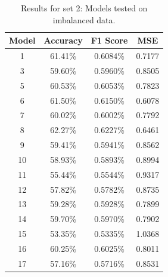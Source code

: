 \begin{table}[H]
	\begin{tabular}{|c|c|c|c|}
		\hline
		\textbf{Model} & \textbf{Accuracy} & \textbf{F1 Score} & \textbf{MSE} \\ \hline
		1              & 61.41\%             &  0.6084\%        &  0.7177   \\
		3              & 59.60\%             &  0.5960\%        &  0.8505   \\
		5              & 60.53\%             &  0.6053\%        &  0.7823   \\
		6              & 61.50\%             &  0.6150\%        &  0.6078   \\
		7              & 60.02\%             &  0.6002\%        &  0.7792   \\
		8              & 62.27\%             &  0.6227\%        &  0.6461   \\
		9              & 59.41\%             &  0.5941\%        &  0.8562   \\
		10             & 58.93\%             &  0.5893\%        &  0.8994   \\
		11             & 55.44\%             &  0.5544\%        &  0.9317   \\
		12             & 57.82\%             &  0.5782\%        &  0.8735   \\	
		13             & 59.28\%             &  0.5928\%        &  0.7899   \\	
		14             & 59.70\%             &  0.5970\%        &  0.7902   \\	
		15             & 53.35\%             &  0.5335\%        &  1.0368   \\	
		16             & 60.25\%             &  0.6025\%        &  0.8011   \\	
		17             & 57.16\%             &  0.5716\%        &  0.8531   \\ \hline	
	\end{tabular}
	\caption{\label{tab:resset2_exp}Results for set 2: Models tested on imbalanced data.}
\end{table}

